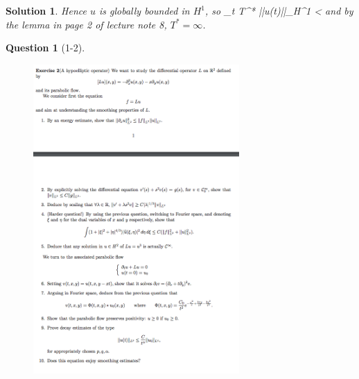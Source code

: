 \documentclass[11pt]{article}
\theoremstyle{plain}
\def\eQb#1\eQe{\begin{eqnarray*}#1\end{eqnarray*}}
\theoremstyle{quest}
\newtheorem*{question}{Question}
\newtheorem*{solution}{Solution}
\begin{document}
\begin{solution}
Hence $u$ is globally bounded in $H^1$, so
\eQb
\limsup_{t \to T^*} ||u(t)||_{H^1} < \infty
\eQe
and by the lemma in page 2 of lecture note 8, $T^* = \infty$.

\end{solution}

\newpage

\begin{question}[1-2]
\hfill
\begin{figure}[h!]
  \centering
    \includegraphics[width=0.7\textwidth]{pde2-f-p2.png}
\end{figure}
\end{question}
\end{document}
